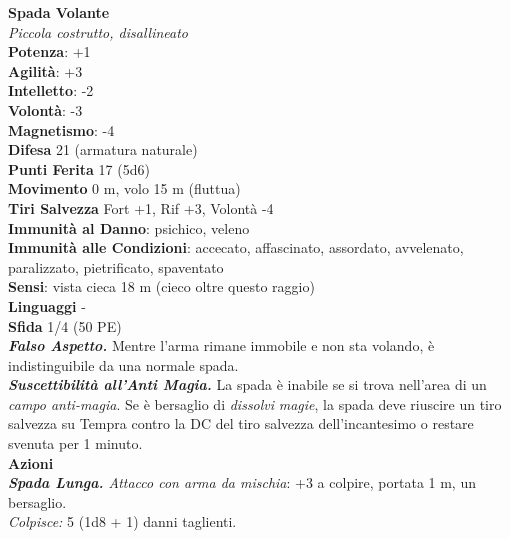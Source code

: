 \begin{multicols}{2}
\medskip\textbf{Spada Volante}\\
\emph{Piccola costrutto, disallineato}\\
\textbf{Potenza}: +1\\
\textbf{Agilità}: +3\\
\textbf{Intelletto}: -2\\
\textbf{Volontà}: -3\\
\textbf{Magnetismo}: -4\\
\textbf{Difesa} 21 (armatura naturale)\\
\textbf{Punti Ferita} 17 (5d6)\\
\textbf{Movimento} 0 m, volo 15 m (fluttua)\\
\textbf{Tiri Salvezza}  Fort +1, Rif +3, Volontà -4\\
\textbf{Immunità al Danno}: psichico, veleno\\
\textbf{Immunità alle Condizioni}: accecato, affascinato, assordato, avvelenato, paralizzato, pietrificato, spaventato\\
\textbf{Sensi}: vista cieca 18 m (cieco oltre questo raggio)\\
\textbf{Linguaggi} -\\
\textbf{Sfida} 1/4 (50 PE)\smallskip\\
\emph{\textbf{Falso Aspetto.}} Mentre l'arma rimane immobile e non sta volando, è indistinguibile da una normale spada.\\
\emph{\textbf{Suscettibilità all'Anti Magia.}} La spada è inabile se si trova nell'area di un \emph{campo anti-magia}. Se è bersaglio di \emph{dissolvi} \emph{magie}, la spada deve riuscire un tiro salvezza su Tempra contro la DC del tiro salvezza dell'incantesimo o restare svenuta per 1 minuto.\\
\smallskip\textbf{Azioni}\\
\emph{\textbf{Spada Lunga.} Attacco con arma da mischia}: +3 a colpire, portata 1 m, un bersaglio.\\
\emph{Colpisce:} 5 (1d8 + 1) danni taglienti.\\


\end{multicols}
